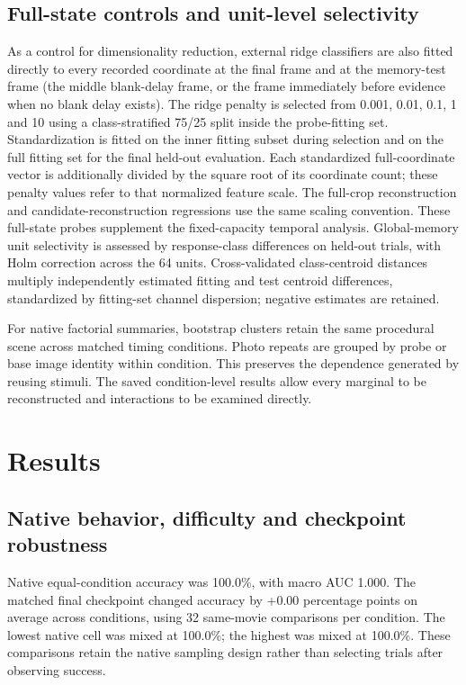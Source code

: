 \documentclass[11pt]{article}
\begin{document}
\subsection{Full-state controls and unit-level selectivity}
As a control for dimensionality reduction, external ridge classifiers are also fitted directly to every recorded coordinate at the final frame and at the memory-test frame (the middle blank-delay frame, or the frame immediately before evidence when no blank delay exists). The ridge penalty is selected from 0.001, 0.01, 0.1, 1 and 10 using a class-stratified 75/25 split inside the probe-fitting set. Standardization is fitted on the inner fitting subset during selection and on the full fitting set for the final held-out evaluation. Each standardized full-coordinate vector is additionally divided by the square root of its coordinate count; these penalty values refer to that normalized feature scale. The full-crop reconstruction and candidate-reconstruction regressions use the same scaling convention. These full-state probes supplement the fixed-capacity temporal analysis. Global-memory unit selectivity is assessed by response-class differences on held-out trials, with Holm correction across the 64 units. Cross-validated class-centroid distances multiply independently estimated fitting and test centroid differences, standardized by fitting-set channel dispersion; negative estimates are retained.

For native factorial summaries, bootstrap clusters retain the same procedural scene across matched timing conditions. Photo repeats are grouped by probe or base image identity within condition. This preserves the dependence generated by reusing stimuli. The saved condition-level results allow every marginal to be reconstructed and interactions to be examined directly.
\section{Results}
\subsection{Native behavior, difficulty and checkpoint robustness}
Native equal-condition accuracy was 100.0\%, with macro AUC 1.000. The matched final checkpoint changed accuracy by +0.00 percentage points on average across conditions, using 32 same-movie comparisons per condition. The lowest native cell was mixed at 100.0\%; the highest was mixed at 100.0\%. These comparisons retain the native sampling design rather than selecting trials after observing success.
\end{document}
